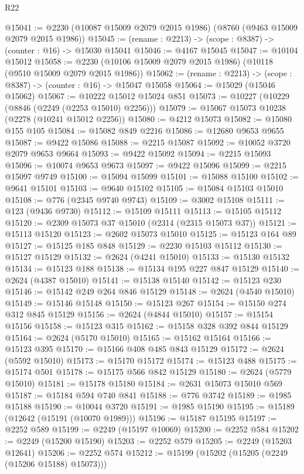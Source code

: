 \begin{lexlean}{R22}
\begin{coremodule}
@15041 := @2230 (@10087 @15009 @2079 @2015 @1986) (@8760 (@9463 @15009 @2079 @2015 @1986))
@15045 := (rename : @2213) -> (scope : @8387) -> (counter : @16) -> @15030 @15041
@15046 := @4167 @15045
@15047 := @10104 @15012
@15058 := @2230 (@10106 @15009 @2079 @2015 @1986) (@10118 (@9510 @15009 @2079 @2015 @1986))
@15062 := (rename : @2213) -> (scope : @8387) -> (counter : @16) -> @15047 @15058
@15064 := @15029 (@15046 @15062)
@15067 := @10222 @15012 @15024 @851
@15073 := @10227 (@10229 (@8846 (@2249 (@2253 @15010) @2256)))
@15079 := @15067 @15073 @10238 (@2278 (@10241 @15012 @2256))
@15080 := @4212 @15073
@15082 := @15080 @155 @105
@15084 := @15082 @849 @2216
@15086 := @12680 @9653 @9655
@15087 := @9422 @15086
@15088 := @2215 @15087
@15092 := @10052 @3720 @2079 @9653 @9664
@15093 := @9422 @15092
@15094 := @2215 @15093
@15096 := @10074 @9653 @9673
@15097 := @9422 @15096
@15099 := @2215 @15097 @9749
@15100 := @15094 @15099
@15101 := @15088 @15100
@15102 := @9641 @15101
@15103 := @9640 @15102
@15105 := @15084 @15103 @15010
@15108 := @776 (@2345 @9740 @9743)
@15109 := @3002 @15108
@15111 := @123 (@9436 @9730)
@15112 := @15109 @15111
@15113 := @15105 @15112
@15120 := @2309 @15073 @37 @15010 (@2314 (@2315 @15073 @37))
@15121 := @15113 @15120
@15123 := @2602 @15073 @15010
@15125 := @15123 @164 @89
@15127 := @15125 @185 @848
@15129 := @2230 @15103 @15112
@15130 := @15127 @15129
@15132 := @2624 (@4241 @15010)
@15133 := @15130 @15132
@15134 := @15123 @188
@15138 := @15134 @195 @227 @847 @15129
@15140 := @2624 (@4387 @15010)
@15141 := @15138 @15140
@15142 := @15123 @230
@15146 := @15142 @249 @264 @846 @15129
@15148 := @2624 (@4540 @15010)
@15149 := @15146 @15148
@15150 := @15123 @267
@15154 := @15150 @274 @312 @845 @15129
@15156 := @2624 (@4844 @15010)
@15157 := @15154 @15156
@15158 := @15123 @315
@15162 := @15158 @328 @392 @844 @15129
@15164 := @2624 (@5170 @15010)
@15165 := @15162 @15164
@15166 := @15123 @395
@15170 := @15166 @408 @485 @843 @15129
@15172 := @2624 (@5592 @15010)
@15173 := @15170 @15172
@15174 := @15123 @488
@15175 := @15174 @501
@15178 := @15175 @566 @842 @15129
@15180 := @2624 (@5779 @15010)
@15181 := @15178 @15180
@15184 := @2631 @15073 @15010 @569
@15187 := @15184 @594 @740 @841
@15188 := @776 @3742
@15189 := @1985 @15188
@15190 := @10044 @3720
@15191 := @1985 @15190
@15195 := @15189 (@12642 (@15191 (@10070 @1989)))
@15196 := @15187 @15195
@15197 := @2252 @589
@15199 := @2249 (@15197 @10069)
@15200 := @2252 @584
@15202 := @2249 (@15200 @15190)
@15203 := @2252 @579
@15205 := @2249 (@15203 @12641)
@15206 := @2252 @574
@15212 := @15199 (@15202 (@15205 (@2249 (@15206 @15188) @15073)))

\end{coremodule}
\end{lexlean}
